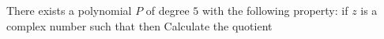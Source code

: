There exists a polynomial $P$ of degree $5$ with the following property: if $z$ is a complex number such that  then  Calculate the quotient 